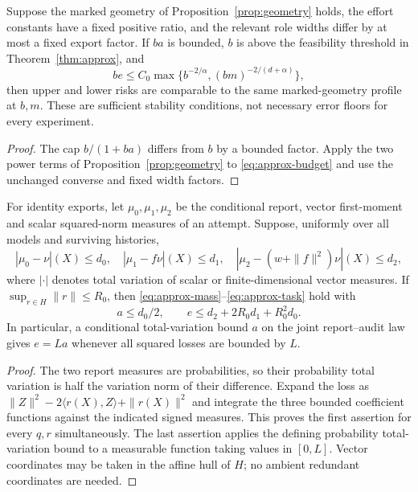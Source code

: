 \begin{corollary}\label{cor:approx-geometry}
Suppose the marked geometry of Proposition~\ref{prop:geometry} holds, the effort constants have a fixed positive ratio, and the relevant role widths differ by at most a fixed export factor. If $ba$ is bounded, $b$ is above the feasibility threshold in Theorem~\ref{thm:approx}, and
\[
 be\le C_0\max\{b^{-2/\alpha},(bm)^{-2/(d+\alpha)}\},
\]
then upper and lower risks are comparable to the same marked-geometry profile at $b,m$. These are sufficient stability conditions, not necessary error floors for every experiment.
\end{corollary}
\begin{proof}
The cap $b/(1+ba)$ differs from $b$ by a bounded factor. Apply the two power terms of Proposition~\ref{prop:geometry} to \eqref{eq:approx-budget} and use the unchanged converse and fixed width factors.
\end{proof}

\begin{proposition}\label{prop:approx-moments}
For identity exports, let $\mu_0,\mu_1,\mu_2$ be the conditional report, vector first-moment and scalar squared-norm measures of an attempt. Suppose, uniformly over all models and surviving histories,
\[
 |\mu_0-\nu|(X)\le d_0,\quad
 |\mu_1-f\nu|(X)\le d_1,\quad
 |\mu_2-(w+\|f\|^2)\nu|(X)\le d_2,
\]
where $|\cdot|$ denotes total variation of scalar or finite-dimensional vector measures. If $\sup_{r\in H}\|r\|\le R_0$, then \eqref{eq:approx-mass}--\eqref{eq:approx-task} hold with
\[
 a\le d_0/2,\qquad e\le d_2+2R_0d_1+R_0^2d_0.
\]
In particular, a conditional total-variation bound $a$ on the joint report--audit law gives $e=La$ whenever all squared losses are bounded by $L$.
\end{proposition}
\begin{proof}
The two report measures are probabilities, so their probability total variation is half the variation norm of their difference. Expand the loss as $\|Z\|^2-2\langle r(X),Z\rangle+\|r(X)\|^2$ and integrate the three bounded coefficient functions against the indicated signed measures. This proves the first assertion for every $q,r$ simultaneously. The last assertion applies the defining probability total-variation bound to a measurable function taking values in $[0,L]$. Vector coordinates may be taken in the affine hull of $H$; no ambient redundant coordinates are needed.
\end{proof}

